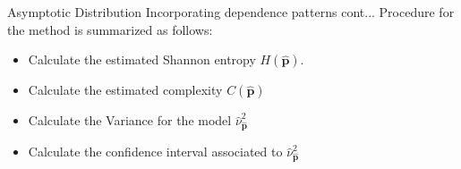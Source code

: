 \documentclass{beamer}
\begin{document}

\begin{frame}{Asymptotic Distribution Incorporating dependence patterns cont...} %
Procedure for the method is summarized as follows:

	\begin{itemize}
		\item Calculate the estimated Shannon entropy $H(\widehat{\mathbf{p}})$.
		\item Calculate the estimated complexity $C(\widehat{\bm{p}})$ 
		\item Calculate the Variance for the model $\widehat{\nu}^2_{\widehat{\mathbf{p}}}$  
		\item Calculate the confidence interval associated to $\widehat{\nu}^2_{\widehat{\mathbf{p}}}$  
	\end{itemize}
\end{frame}


	
\end{document}
